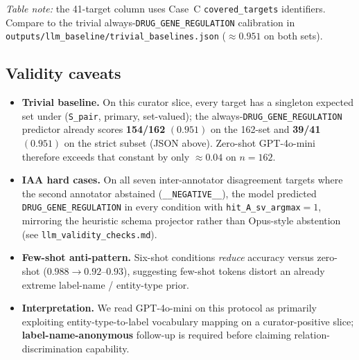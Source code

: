 \noindent\textit{Table note:} the 41-target column uses Case~C
\texttt{covered\_targets} identifiers. Compare to the trivial always-\texttt{DRUG\_GENE\_REGULATION}
calibration in \texttt{outputs/llm\_baseline/trivial\_baselines.json} ($\approx\!0.951$
on both sets).

\subsection{Validity caveats}
\label{supp:llm-caveats}

\begin{itemize}[leftmargin=1.15em]
  \item \textbf{Trivial baseline.} On this curator slice, every target has a
        singleton expected set under (\texttt{S\_pair}, primary, set-valued); the
        always-\texttt{DRUG\_GENE\_REGULATION} predictor already scores
        \textbf{154/162} $(0.951)$ on the 162-set and \textbf{39/41} $(0.951)$ on
        the strict subset (JSON above). Zero-shot GPT-4o-mini therefore exceeds
        that constant by only $\approx\!0.04$ on $n=162$.
  \item \textbf{IAA hard cases.} On all seven inter-annotator disagreement targets
        where the second annotator abstained (\texttt{\_\_NEGATIVE\_\_}), the
        model predicted \texttt{DRUG\_GENE\_REGULATION} in every condition with
        \texttt{hit\_A\_sv\_argmax}$=1$, mirroring the heuristic schema projector
        rather than Opus-style abstention (see \texttt{llm\_validity\_checks.md}).
  \item \textbf{Few-shot anti-pattern.} Six-shot conditions \emph{reduce}
        accuracy versus zero-shot ($0.988\to 0.92$--$0.93$), suggesting few-shot
        tokens distort an already extreme label-name / entity-type prior.
  \item \textbf{Interpretation.} We read GPT-4o-mini on this protocol as
        primarily exploiting entity-type-to-label vocabulary mapping on a
        curator-positive slice; \textbf{label-name-anonymous} follow-up is
        required before claiming relation-discrimination capability.
\end{itemize}
